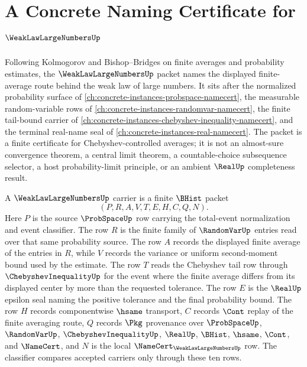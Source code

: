 \chapter{A Concrete Naming Certificate for $\WeakLawLargeNumbersUp$}
\label{ch:concrete-instances-weak-law-large-numbers-namecert}

Following Kolmogorov and Bishop--Bridges on finite averages and probability estimates, the $\WeakLawLargeNumbersUp$ packet names the displayed finite-average route behind the weak law of large numbers. It sits after the normalized probability surface of \autoref{ch:concrete-instances-probspace-namecert}, the measurable random-variable rows of \autoref{ch:concrete-instances-randomvar-namecert}, the finite tail-bound carrier of \autoref{ch:concrete-instances-chebyshev-inequality-namecert}, and the terminal real-name seal of \autoref{ch:concrete-instances-real-namecert}. The packet is a finite certificate for Chebyshev-controlled averages; it is not an almost-sure convergence theorem, a central limit theorem, a countable-choice subsequence selector, a host probability-limit principle, or an ambient $\RealUp$ completeness result.

\begin{definition}\label{def:weak-law-large-numbers-carrier}
A $\WeakLawLargeNumbersUp$ carrier is a finite $\BHist$ packet
$$
(P,R,A,V,T,E,H,C,Q,N).
$$
Here $P$ is the source $\ProbSpaceUp$ row carrying the total-event normalization and event classifier. The row $R$ is the finite family of $\RandomVarUp$ entries read over that same probability source. The row $A$ records the displayed finite average of the entries in $R$, while $V$ records the variance or uniform second-moment bound used by the estimate. The row $T$ reads the Chebyshev tail row through $\ChebyshevInequalityUp$ for the event where the finite average differs from its displayed center by more than the requested tolerance. The row $E$ is the $\RealUp$ epsilon seal naming the positive tolerance and the final probability bound. The row $H$ records componentwise $\hsame$ transport, $C$ records $\Cont$ replay of the finite averaging route, $Q$ records $\Pkg$ provenance over $\ProbSpaceUp$, $\RandomVarUp$, $\ChebyshevInequalityUp$, $\RealUp$, $\BHist$, $\hsame$, $\Cont$, and $\NameCert$, and $N$ is the local $\NameCert_{\WeakLawLargeNumbersUp}$ row. The classifier compares accepted carriers only through these ten rows.
\end{definition}

